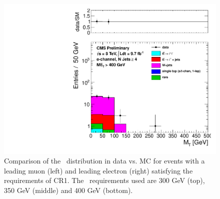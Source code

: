 \begin{figure}[hbt]
\begin{center}
        \includegraphics[width=0.5\linewidth]{plots/CR1plots/mt_met400_leadele_nj4.pdf}
    \caption{
      Comparison of the \mt\ distribution in data vs. MC for events
      with a leading muon (left) and leading electron (right)
      satisfying the requirements of CR1. The \met\ requirements used are
      300 GeV (top), 350 GeV (middle) and 400 GeV (bottom).
\label{fig:cr1mtrest2} 
}  
      \end{center}
\end{figure}


\clearpage